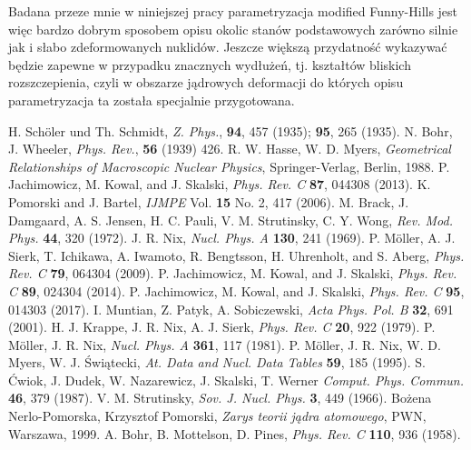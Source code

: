 \documentclass[a4paper,polish]{article}
\numberwithin{equation}{section}
\begin{document}
Badana przeze mnie w niniejszej pracy parametryzacja modified Funny-Hills jest więc bardzo dobrym sposobem opisu okolic stanów podstawowych zarówno silnie jak i słabo zdeformowanych nuklidów. Jeszcze większą przydatność wykazywać będzie zapewne w przypadku znacznych wydłużeń, tj. kształtów bliskich rozszczepienia, czyli w obszarze jądrowych deformacji do których opisu parametryzacja ta została specjalnie przygotowana.

\clearpage
\begin{thebibliography}{9}

H. Sch{\"o}ler und Th. Schmidt, \textit{Z. Phys.}, \textbf{94}, 457 (1935);  \textbf{95}, 265 (1935).
N. Bohr, J. Wheeler, \textit{Phys. Rev.}, \textbf{56} (1939) 426.
R. W. Hasse, W. D. Myers, \textit{Geometrical Relationships of Macroscopic Nuclear Physics}, Springer-Verlag, Berlin, 1988. 
P. Jachimowicz, M. Kowal, and J. Skalski, \textit{Phys. Rev. C} \textbf{87}, 044308 (2013).
K. Pomorski and J. Bartel, \textit{IJMPE} Vol. \textbf{15} No. 2, 417 (2006).
M. Brack, J. Damgaard, A. S. Jensen, H. C. Pauli, V. M. Strutinsky, C. Y. Wong, \textit{Rev. Mod. Phys.} \textbf{44}, 320 (1972).
J. R. Nix, \textit{Nucl. Phys. A} \textbf{130}, 241 (1969).
P. M{\"o}ller, A. J. Sierk, T. Ichikawa, A. Iwamoto, R. Bengtsson, H. Uhrenholt, and S. Aberg, \textit {Phys. Rev. C} \textbf{79}, 064304 (2009).
P. Jachimowicz, M. Kowal, and J. Skalski, \textit{Phys. Rev. C} \textbf{89}, 024304 (2014).
P. Jachimowicz, M. Kowal, and J. Skalski, \textit{Phys. Rev. C} \textbf{95}, 014303 (2017).
I. Muntian, Z. Patyk, A. Sobiczewski, \textit{Acta Phys. Pol. B} \textbf{32}, 691 (2001).
H. J. Krappe, J. R. Nix, A. J. Sierk, \textit{Phys. Rev. C} \textbf{20}, 922 (1979).
P. M{\"o}ller, J. R. Nix, \textit{Nucl. Phys. A} \textbf{361}, 117 (1981).
P. M{\"o}ller, J. R. Nix, W. D. Myers, W. J. Świątecki, \textit{At. Data and Nucl. Data Tables} \textbf{59}, 185 (1995).
S. Ćwiok, J. Dudek, W. Nazarewicz, J. Skalski, T. Werner \textit{Comput. Phys. Commun.} \textbf{46}, 379 (1987).
V. M. Strutinsky, \textit{Sov. J. Nucl. Phys.} \textbf{3}, 449 (1966).
Bożena Nerlo-Pomorska, Krzysztof Pomorski, \textit{Zarys teorii jądra atomowego}, PWN, Warszawa, 1999.
A. Bohr, B. Mottelson, D. Pines, \textit{Phys. Rev. C} \textbf{110}, 936 (1958).

\end{thebibliography}
\end{document}
